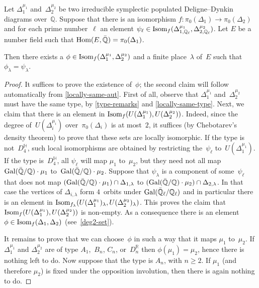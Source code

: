 \documentclass[10pt,twoside,leqno]{article}
\numberwithin{equation}{subsection}
\newcommand{\Hom}{\textnormal{Hom}}
\newcommand{\Isom}{\textnormal{Isom}}
\newcommand{\QQ}{\mathbb{Q}}
\newcommand{\QQbar}{\bar{\QQ}}
\newcommand{\QQl}{\QQ_{\ell}}
\newcommand{\QQlbar}{\QQbar_{\ell}}
\newcommand{\RR}{\mathbb{R}}
\newcommand{\HQ}{\mathbb{H}}
\newcommand{\Gal}{\textnormal{Gal}}
\begin{document}
\begin{proposition} %
 \label{deldyn-local-global}
 Let $\Delta_1^{\mu_1}$ and~$\Delta_2^{\mu_2}$ be two
 irreducible symplectic populated Deligne--Dynkin diagrams over~$\QQ$.
 Suppose that there is an isomorphism
 $f \colon \pi_0(\Delta_1) \to \pi_0(\Delta_2)$
 and for each prime number~$\ell$ an element
 $\psi_\ell \in \Isom_f(\Delta_{1,\QQl}^{\mu_1},\Delta_{2,\QQl}^{\mu_2})$.
 Let $E$ be a number field such that $\Hom(E,\QQbar) = \pi_0(\Delta_1)$.

 Then there exists a $\phi \in \Isom_f(\Delta_1^{\mu_1},\Delta_2^{\mu_2})$
 and a finite place~$\lambda$ of~$E$
 such that $\phi_\lambda = \psi_\lambda$.
 \begin{proof}
  It suffices to prove the existence of~$\phi$;
  the second claim will follow automatically from \cref{locally-same-aut}.
  First of all, observe that $\Delta_1^{\mu_1}$ and~$\Delta_2^{\mu_2}$
  must have the same type, by \cref{type-remarks} and \cref{locally-same-type}.
  Next, we claim that there is an element in
  $\Isom_f(U(\Delta_1^{\mu_1}),U(\Delta_2^{\mu_2}))$.
  Indeed, since the degree of~$U(\Delta_i^{\mu_i})$ over~$\pi_0(\Delta_i)$
  is at most~$2$,
  it suffices (by Chebotarev's density theorem)
  to prove that these sets are locally isomorphic.
  If the type is not~$D_4^\HQ$,
  such local isomorphisms are obtained
  by restricting the~$\psi_\ell$ to~$U(\Delta_1^{\mu_1})$.
  If the type is~$D_4^\HQ$,
  all $\psi_\ell$ will map $\mu_1$ to~$\mu_2$,
  but they need not all map $\Gal(\QQbar/\QQ)\cdot\mu_1$
  to~$\Gal(\QQbar/\QQ)\cdot\mu_2$.
  Suppose that $\psi_\lambda$ is a component of some~$\psi_\ell$
  that does not map $(\Gal(\QQbar/\QQ)\cdot\mu_1) \cap \Delta_{1,\lambda}$
  to $(\Gal(\QQbar/\QQ)\cdot\mu_2) \cap \Delta_{2,\lambda}$.
  In that case the vertices of $\Delta_{i,\lambda}$
  form $4$~orbits under $\Gal(\QQlbar/\QQl)$
  and in particular there is an element in
  $\Isom_{f_\lambda}(U(\Delta_1^{\mu_1})_{\lambda},
  U(\Delta_2^{\mu_2})_{\lambda})$.
  This proves the claim that
  $\Isom_f(U(\Delta_1^{\mu_1}),U(\Delta_2^{\mu_2}))$ is non-empty.
  As a consequence there is an element
  $\phi \in \Isom_f(\Delta_1, \Delta_2)$ (see~\cref{deg2-set}).

  It remains to prove that we can choose~$\phi$
  in such a way that it maps $\mu_1$ to~$\mu_2$.
  If $\Delta_1^{\mu_1}$ and $\Delta_2^{\mu_2}$
  are of type $A_1$,~$B_n$, $C_n$, or~$D_n^\RR$ then $\phi(\mu_1) = \mu_2$,
  hence there is nothing left to do.
  Now suppose that the type is $A_n$, with $n \ge 2$.
  If $\mu_1$ (and therefore $\mu_2$) is fixed
  under the opposition involution,
  then there is again nothing to do.


\end{proof}
\end{proposition}
\end{document}
